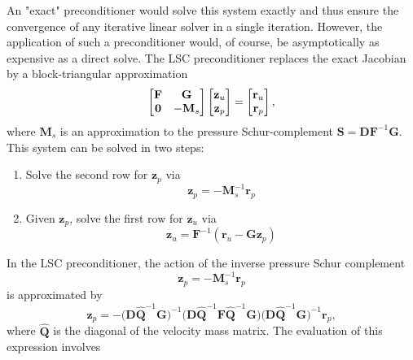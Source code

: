 An "exact" preconditioner would solve this system exactly and thus ensure the
convergence of any iterative linear solver in a single iteration. However, the
application of such a preconditioner would, of course, be asymptotically as
expensive as a direct solve.  The LSC preconditioner replaces the exact
Jacobian by a block-triangular approximation
\begin{equation*}
\begin{bmatrix}
{\bf F} & {\bf G} \\ {\bf 0} & -{\bf M}_s 
\end{bmatrix} 
\begin{bmatrix}
{\bf z}_u \\ {\bf z}_p
\end{bmatrix} 
=
\begin{bmatrix}
{\bf r}_u \\ {\bf r}_p
\end{bmatrix}
,
\end{equation*}
where $\mathbf{M}_s$ is an approximation to the pressure 
Schur-complement $\mathbf{S}=\mathbf{D} \mathbf{F}^{-1}\mathbf{G}$.
This system can be solved in two steps:
\begin{enumerate}
\item Solve the second row for $\mathbf{z}_p$ via
   \begin{equation*}
   \mathbf{z}_p = - \mathbf{M}_s^{-1} \mathbf{r}_p
   \end{equation*}
\item Given $\mathbf{ z}_p$, solve the first row for $\mathbf{z}_u$ via
   \begin{equation*}
   \mathbf{z}_u = \mathbf{F}^{-1} \left( \mathbf{r}_u - \mathbf{G} \mathbf{z}_p \right)
   \end{equation*}
\end{enumerate}
In the LSC preconditioner, the action of the inverse pressure
Schur complement 
\begin{equation*}
\mathbf{z}_p = - \mathbf{M}_s^{-1} \mathbf{r}_p
\end{equation*}
is approximated by
\begin{equation*}
\mathbf{z}_p = - 
\big(\mathbf{D} \widehat{\mathbf Q}^{-1}{\mathbf G} \big)^{-1}
\big({\mathbf D} \widehat{\mathbf Q}^{-1}{\mathbf F} \widehat{\mathbf Q}^{-1}{\mathbf G}\big) 
\big({\mathbf D} \widehat{\mathbf Q}^{-1}{\mathbf G} \big)^{-1}
{\mathbf r}_p,
\end{equation*}
where  $ \widehat{\mathbf Q}$ is the diagonal of the velocity
mass matrix. The evaluation of this expression involves
